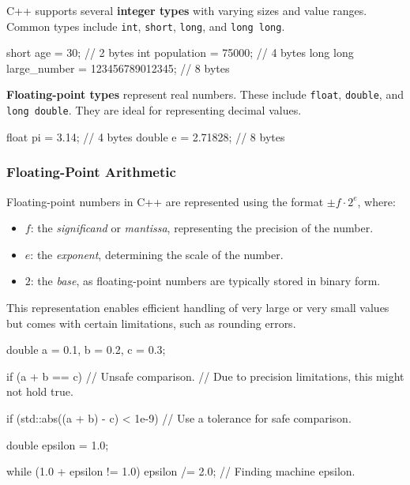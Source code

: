 C++ supports several \textbf{integer types} with varying sizes and value ranges. Common types include \texttt{int}, \texttt{short}, \texttt{long}, and \texttt{long long}.

\vspace{-0.5em}

\begin{codeblock}[language=C++, numbers=none]    
short age = 30;                             // 2 bytes
int population = 75000;                     // 4 bytes 
long long large_number = 123456789012345;   // 8 bytes
\end{codeblock}

\textbf{Floating-point types} represent real numbers. These include \texttt{float}, \texttt{double}, and \texttt{long double}. They are ideal for representing decimal values.

\vspace{-0.5em}

\begin{codeblock}[language=C++, numbers=none]
float pi = 3.14;        // 4 bytes
double e = 2.71828;     // 8 bytes
\end{codeblock}

\subsubsection{Floating-Point Arithmetic}

Floating-point numbers in C++ are represented using the format $\pm f \cdot 2^e$, where:
\begin{itemize}
    \item $f$: the \textit{significand} or \textit{mantissa}, representing the precision of the number.
    \item $e$: the \textit{exponent}, determining the scale of the number.
    \item $2$: the \textit{base}, as floating-point numbers are typically stored in binary form.
\end{itemize}

This representation enables efficient handling of very large or very small values but comes with certain limitations, such as rounding errors.

\begin{exampleblock}
    \begin{codeblock}[language=C++]
double a = 0.1, b = 0.2, c = 0.3;

if (a + b == c) { // Unsafe comparison.
    // Due to precision limitations, this might not hold true.
}

if (std::abs((a + b) - c) < 1e-9) {
    // Use a tolerance for safe comparison.
}
    \end{codeblock}
    \begin{codeblock}[language=C++]
double epsilon = 1.0;
        
while (1.0 + epsilon != 1.0) {
    epsilon /= 2.0; // Finding machine epsilon.
}
    \end{codeblock}
\end{exampleblock}

